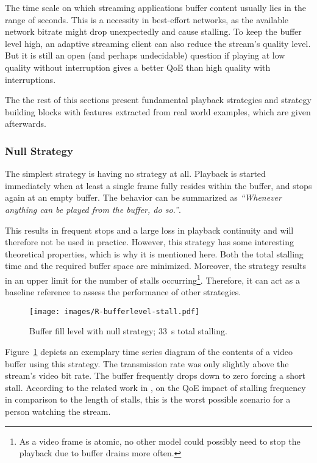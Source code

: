 The time scale on which streaming applications buffer content usually lies in the range of seconds. This is a necessity in best-effort networks, as the available network bitrate might drop unexpectedly and cause stalling. To keep the buffer level high, an adaptive streaming client can also reduce the stream's quality level. But it is still an open (and perhaps undecidable) question if playing at low quality without interruption gives a better \gls{QoE} than high quality with interruptions.

The the rest of this sections present fundamental playback strategies and strategy building blocks with features extracted from real world examples, which are given afterwards. 



\subsubsection{Null Strategy}

The simplest strategy is having no strategy at all. Playback is started immediately when at least a single frame fully resides within the buffer, and stops again at an empty buffer. The behavior can be summarized as \textit{``Whenever anything can be played from the buffer, do so.''}.

This results in frequent stops and a large loss in playback continuity and will therefore not be used in practice. However, this strategy has some interesting theoretical properties, which is why it is mentioned here. Both the total stalling time and the required buffer space are minimized. Moreover, the strategy results in an upper limit for the number of stalls occurring\footnote{As a video frame is atomic, no other model could possibly need to stop the playback due to buffer drains more often.}. 
Therefore, it can act as a baseline reference to assess the performance of other strategies.

\begin{figure}[htb]
	\centering
	\texttt{[image: images/R-bufferlevel-stall.pdf]}
	\caption{Buffer fill level with null strategy; \SI{33}{\second} total stalling.}
\label{c3:fig:bufferlevel-stall}
\end{figure}

Figure~\ref{c3:fig:bufferlevel-stall} depicts an exemplary time series diagram of the contents of a video buffer using this strategy. The transmission rate was only slightly above the stream's video bit rate. The buffer frequently drops down to zero forcing a short stall. According to the related work in \cite{6123395}, on the \gls{QoE} impact of stalling frequency in comparison to the length of stalls, this is the worst possible scenario for a person watching the stream.


